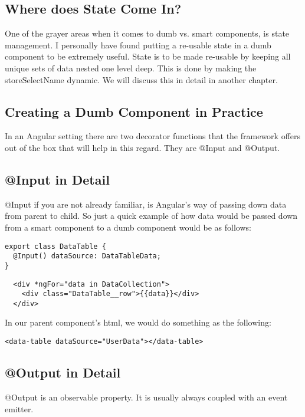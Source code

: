 \subsection{ Where does State Come In? }
One of the grayer areas when it comes to dumb vs. smart components, is state
management. I personally have found putting a re-usable state in a dumb
component to be extremely useful. State is to be made re-usable by keeping all
unique sets of data nested one level deep. This is done by making the
storeSelectName dynamic. We will discuss this in detail in another chapter.

\subsection{Creating a Dumb Component in Practice}
In an Angular setting there are two decorator functions that the framework
offers out of the box that will help in this regard. They are @Input and
@Output.

\subsection{@Input in Detail}
@Input if you are not already familiar, is Angular's way of passing down data
from parent to child. So just a quick example of how data would be passed down
from a smart component to a dumb component would be as follows:
\begin{lstlisting}
export class DataTable {
  @Input() dataSource: DataTableData;
}
\end{lstlisting}
\begin{verbatim}
  <div *ngFor="data in DataCollection">
    <div class="DataTable__row">{{data}}</div>
  </div>
\end{verbatim}

In our parent component's html, we would do something as the following:
\begin{lstlisting}
<data-table dataSource="UserData"></data-table>
\end{lstlisting}


\subsection{@Output in Detail}
@Output is an observable property. It is usually always coupled with an
event emitter.
